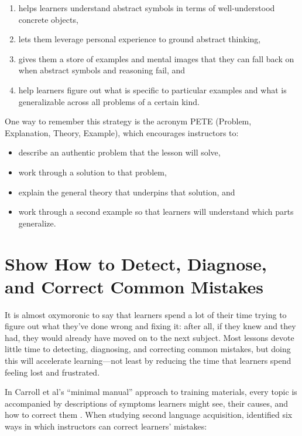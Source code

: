\documentclass[10pt,letterpaper]{article}
\newcommand{\rulemajor}[1]{\section{#1}}
\begin{document}
\begin{enumerate}

\item helps learners understand abstract symbols in terms of well-understood
  concrete objects,

\item lets them leverage personal experience to ground abstract thinking,

\item gives them a store of examples and mental images that they can fall back
  on when abstract symbols and reasoning fail, and

\item help learners figure out what is specific to particular examples and what
  is generalizable across all problems of a certain kind.

\end{enumerate}

One way to remember this strategy is the acronym PETE (Problem, Explanation,
Theory, Example), which encourages instructors to:

\begin{itemize}

\item describe an authentic problem that the lesson will solve,

\item work through a solution to that problem,

\item explain the general theory that underpins that solution, and

\item work through a second example so that learners will understand which parts
  generalize.

\end{itemize}

\rulemajor{Show How to Detect, Diagnose, and Correct Common Mistakes}

It is almost oxymoronic to say that learners spend a lot of their time trying to
figure out what they've done wrong and fixing it: after all, if they knew and
they had, they would already have moved on to the next subject.  Most lessons
devote little time to detecting, diagnosing, and correcting common mistakes, but
doing this will accelerate learning---not least by reducing the time that
learners spend feeling lost and frustrated.

In Carroll et al's ``minimal manual'' approach to training materials, every
topic is accompanied by descriptions of symptoms learners might see, their
causes, and how to correct them \cite{Carr2014}.  When studying second language
acquisition, \cite{Lyst1997} identified six ways in which instructors can
correct learners' mistakes:
\end{document}
